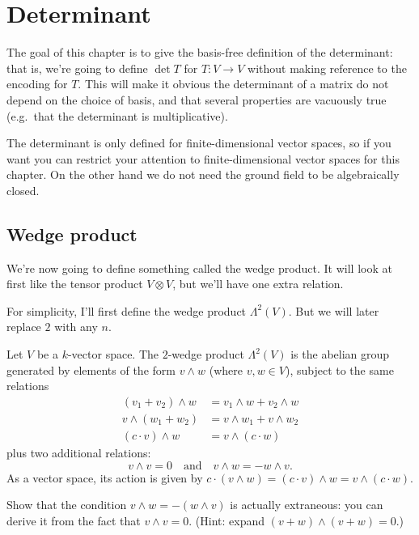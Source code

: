 \chapter{Determinant}
The goal of this chapter is to give the basis-free
definition of the determinant:
that is, we're going to define $\det T$
for $T \colon V \to V$ without making reference to the encoding for $T$.
This will make it obvious the determinant of a matrix
do not depend on the choice of basis,
and that several properties are vacuously true
(e.g.\ that the determinant is multiplicative).

The determinant is only defined for finite-dimensional
vector spaces, so if you want you can restrict
your attention to finite-dimensional vector spaces for this chapter.
On the other hand we do not need the
ground field to be algebraically closed.

\section{Wedge product}
We're now going to define something called the wedge product.
It will look at first like the tensor product $V \otimes V$,
but we'll have one extra relation.

For simplicity, I'll first define the wedge product $\Lambda^2(V)$.
But we will later replace $2$ with any $n$.

\begin{definition}
	Let $V$ be a $k$-vector space.
	The $2$-wedge product $\Lambda^2(V)$ is the abelian group
	generated by elements of the form $v \wedge w$ (where $v,w \in V$),
	subject to the same relations
	\begin{align*}
		(v_1 + v_2) \wedge w &= v_1 \wedge w + v_2 \wedge w \\
		v \wedge (w_1 + w_2) &= v \wedge w_1 + v \wedge w_2 \\
		(c \cdot v) \wedge w &= v \wedge (c \cdot w)
	\end{align*}
	plus two additional relations:
	\[ v \wedge v = 0 \quad\text{and}\quad
		v \wedge w = - w \wedge v. \]
	As a vector space, its action is given by
	$c \cdot (v \wedge w) = (c \cdot v) \wedge w = v \wedge (c \cdot w)$.
\end{definition}
\begin{exercise}
	Show that the condition $v \wedge w = - (w \wedge v)$
	is actually extraneous:
	you can derive it from the fact that $v \wedge v = 0$.
	(Hint: expand $(v + w) \wedge (v + w) = 0$.)
\end{exercise}

